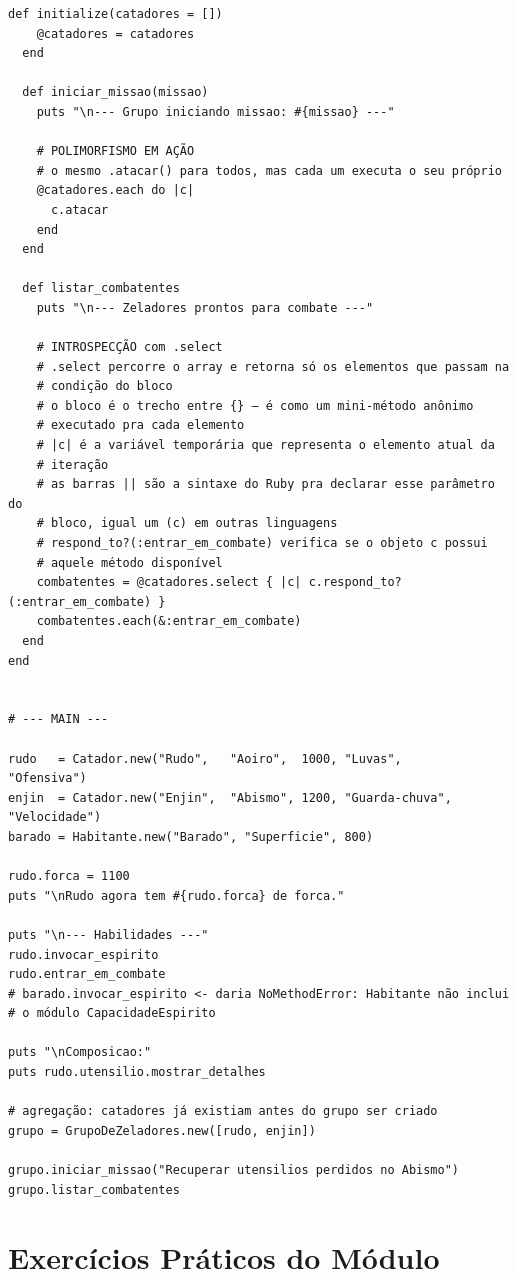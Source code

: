 \begin{lstlisting}[style=ruby, caption={Exemplo de Aplicação de POO em Ruby}]
  def initialize(catadores = [])
    @catadores = catadores
  end

  def iniciar_missao(missao)
    puts "\n--- Grupo iniciando missao: #{missao} ---"

    # POLIMORFISMO EM AÇÃO
    # o mesmo .atacar() para todos, mas cada um executa o seu próprio
    @catadores.each do |c|
      c.atacar
    end
  end

  def listar_combatentes
    puts "\n--- Zeladores prontos para combate ---"

    # INTROSPECÇÃO com .select
    # .select percorre o array e retorna só os elementos que passam na
    # condição do bloco
    # o bloco é o trecho entre {} — é como um mini-método anônimo
    # executado pra cada elemento
    # |c| é a variável temporária que representa o elemento atual da
    # iteração
    # as barras || são a sintaxe do Ruby pra declarar esse parâmetro do
    # bloco, igual um (c) em outras linguagens
    # respond_to?(:entrar_em_combate) verifica se o objeto c possui
    # aquele método disponível
    combatentes = @catadores.select { |c| c.respond_to?(:entrar_em_combate) }
    combatentes.each(&:entrar_em_combate)
  end
end


# --- MAIN ---

rudo   = Catador.new("Rudo",   "Aoiro",  1000, "Luvas",        "Ofensiva")
enjin  = Catador.new("Enjin",  "Abismo", 1200, "Guarda-chuva", "Velocidade")
barado = Habitante.new("Barado", "Superficie", 800)

rudo.forca = 1100
puts "\nRudo agora tem #{rudo.forca} de forca."

puts "\n--- Habilidades ---"
rudo.invocar_espirito
rudo.entrar_em_combate
# barado.invocar_espirito <- daria NoMethodError: Habitante não inclui
# o módulo CapacidadeEspirito

puts "\nComposicao:"
puts rudo.utensilio.mostrar_detalhes

# agregação: catadores já existiam antes do grupo ser criado
grupo = GrupoDeZeladores.new([rudo, enjin])

grupo.iniciar_missao("Recuperar utensilios perdidos no Abismo")
grupo.listar_combatentes
\end{lstlisting}

\section{Exercícios Práticos do Módulo}

